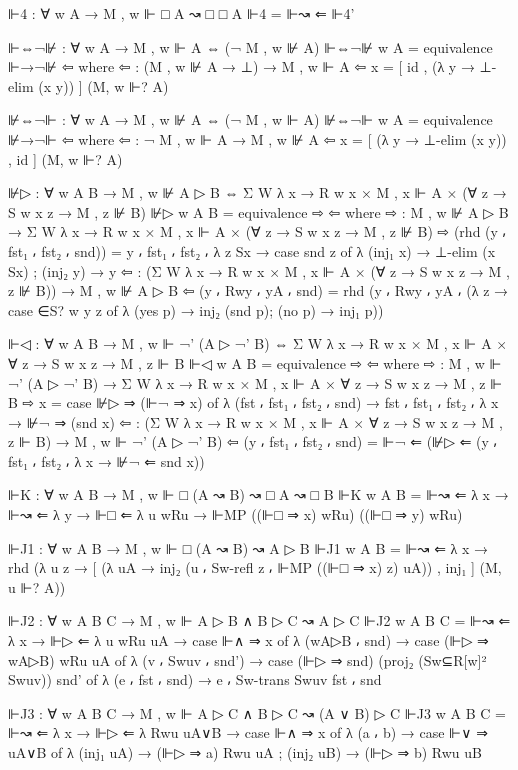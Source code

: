 \begin{spverbatim}
  ⊩4 : ∀ {w A} → M , w ⊩ □ A ↝ □ □ A
  ⊩4 = ⊩↝ ⇐ ⊩4'

  ⊩⇔¬⊮ : ∀ {w A} → M , w ⊩ A ⇔ (¬ M , w ⊮ A)
  ⊩⇔¬⊮ {w} {A} = equivalence ⊩→¬⊮ ⇦
    where
    ⇦ : (M , w ⊮ A → ⊥) → M , w ⊩ A
    ⇦ x = [ id , (λ y → ⊥-elim (x y)) ] (M, w ⊩? A)

  ⊮⇔¬⊩ : ∀ {w A} → M , w ⊮ A ⇔ (¬ M , w ⊩ A)
  ⊮⇔¬⊩ {w} {A} = equivalence ⊮→¬⊩ ⇦
    where
    ⇦ : ¬ M , w ⊩ A → M , w ⊮ A
    ⇦ x = [ (λ y → ⊥-elim (x y)) , id ] (M, w ⊩? A)

  ⊮▷ : ∀ {w A B} → M , w ⊮ A ▷ B ⇔ Σ W λ x → R w x × M , x ⊩ A
    × (∀ {z} → S w x z → M , z ⊮ B)
  ⊮▷ {w} {A} {B} = equivalence ⇨ ⇦
    where
    ⇨ : M , w ⊮ A ▷ B → Σ W λ x → R w x × M , x ⊩ A
      × (∀ {z} → S w x z → M , z ⊮ B)
    ⇨ (rhd (y ⸴ fst₁ ⸴ fst₂ ⸴ snd)) = y ⸴ fst₁ ⸴ fst₂ ⸴ λ { {z} Sx → case snd z of
      λ { (inj₁ x) → ⊥-elim (x Sx) ; (inj₂ y) → y}}
    ⇦ : (Σ W λ x → R w x × M , x ⊩ A × (∀ {z} → S w x z → M , z ⊮ B)) → M , w ⊮ A ▷ B
    ⇦ (y ⸴ Rwy ⸴ yA ⸴ snd) = rhd (y ⸴ Rwy ⸴ yA ⸴ (λ z → case ∈S? w y z of
      λ { (yes p) → inj₂ (snd p); (no p) → inj₁ p}))

  ⊩◁ : ∀ {w A B} → M , w ⊩ ¬' (A ▷ ¬' B) ⇔ Σ W λ x → R w x × M , x ⊩ A
    × ∀ {z} → S w x z → M , z ⊩ B
  ⊩◁ {w} {A} {B} = equivalence ⇨ ⇦
    where
    ⇨ : M , w ⊩ ¬' (A ▷ ¬' B) → Σ W λ x → R w x × M , x ⊩ A
      × ∀ {z} → S w x z → M , z ⊩ B
    ⇨ x = case ⊮▷ ⇒ (⊩¬ ⇒ x) of λ { (fst ⸴ fst₁ ⸴ fst₂ ⸴ snd) → fst ⸴ fst₁ ⸴ fst₂ ⸴
      λ {x → ⊮¬ ⇒ (snd x)}}
    ⇦ : (Σ W λ x → R w x × M , x ⊩ A × ∀ {z} → S w x z → M , z ⊩ B) → M , w ⊩ ¬' (A ▷ ¬' B)
    ⇦ (y ⸴ fst₁ ⸴ fst₂ ⸴ snd) = ⊩¬ ⇐ (⊮▷ ⇐ (y ⸴ fst₁ ⸴ fst₂ ⸴ λ {x → ⊮¬ ⇐ snd x}))

  ⊩K : ∀ {w A B} → M , w ⊩ □ (A ↝ B) ↝ □ A ↝ □ B
  ⊩K {w} {A} {B} = ⊩↝ ⇐ λ x → ⊩↝ ⇐ λ y → ⊩□ ⇐
    λ {u} wRu → ⊩MP ((⊩□ ⇒ x) wRu) ((⊩□ ⇒ y) wRu)

  ⊩J1 : ∀ {w A B} → M , w ⊩ □ (A ↝ B) ↝ A ▷ B
  ⊩J1 {w} {A} {B} = ⊩↝ ⇐ λ x → rhd (λ {u} z →
    [ (λ uA → inj₂ (u ⸴ Sw-refl z ⸴
    ⊩MP ((⊩□ ⇒ x) z) uA)) , inj₁ ] (M, u ⊩? A))

  ⊩J2 : ∀ {w A B C} → M , w ⊩ A ▷ B ∧ B ▷ C ↝ A ▷ C
  ⊩J2 {w} {A} {B} {C} = ⊩↝ ⇐ λ x → ⊩▷ ⇐ λ {u} wRu uA → case ⊩∧ ⇒ x of
    λ { (wA▷B ⸴ snd) → case (⊩▷ ⇒ wA▷B) wRu uA of
    λ { (v ⸴ Swuv ⸴ snd') → case (⊩▷ ⇒ snd)
    (proj₂ (Sw⊆R[w]² Swuv)) snd' of
    λ { (e ⸴ fst ⸴ snd) → e ⸴ Sw-trans Swuv fst ⸴  snd}}}

  ⊩J3 : ∀ {w A B C} → M , w ⊩ A ▷ C ∧ B ▷ C ↝ (A ∨ B) ▷ C
  ⊩J3 {w} {A} {B} {C} = ⊩↝ ⇐ λ x → ⊩▷ ⇐ λ Rwu uA∨B → case ⊩∧ ⇒ x of
    λ {(a ⸴ b) → case ⊩∨ ⇒ uA∨B of
    λ { (inj₁ uA) → (⊩▷ ⇒ a) Rwu uA ;
    (inj₂ uB) → (⊩▷ ⇒ b) Rwu uB} }


\end{spverbatim}
